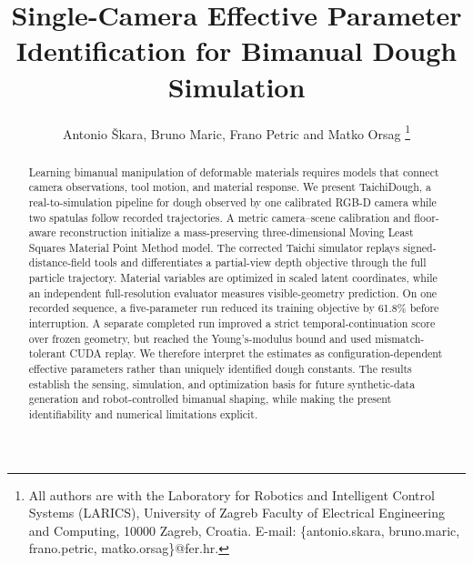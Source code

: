 \documentclass[letterpaper,10pt,conference]{ieeeconf}
\title{Single-Camera Effective Parameter Identification for Bimanual Dough Simulation}
\author{Antonio \v{S}kara, Bruno Maric, Frano Petric and Matko Orsag%
\thanks{All authors are with the Laboratory for Robotics and Intelligent Control Systems (LARICS), University of Zagreb Faculty of Electrical Engineering and Computing, 10000 Zagreb, Croatia. E-mail: \{antonio.skara, bruno.maric, frano.petric, matko.orsag\}@fer.hr.}%
}
\begin{document}
\maketitle

\begin{abstract}
Learning bimanual manipulation of deformable materials requires models that connect camera observations, tool motion, and material response. We present TaichiDough, a real-to-simulation pipeline for dough observed by one calibrated RGB-D camera while two spatulas follow recorded trajectories. A metric camera--scene calibration and floor-aware reconstruction initialize a mass-preserving three-dimensional Moving Least Squares Material Point Method model. The corrected Taichi simulator replays signed-distance-field tools and differentiates a partial-view depth objective through the full particle trajectory. Material variables are optimized in scaled latent coordinates, while an independent full-resolution evaluator measures visible-geometry prediction. On one recorded sequence, a five-parameter run reduced its training objective by 61.8\% before interruption. A separate completed run improved a strict temporal-continuation score over frozen geometry, but reached the Young's-modulus bound and used mismatch-tolerant CUDA replay. We therefore interpret the estimates as configuration-dependent effective parameters rather than uniquely identified dough constants. The results establish the sensing, simulation, and optimization basis for future synthetic-data generation and robot-controlled bimanual shaping, while making the present identifiability and numerical limitations explicit.
\end{abstract}








\end{document}
